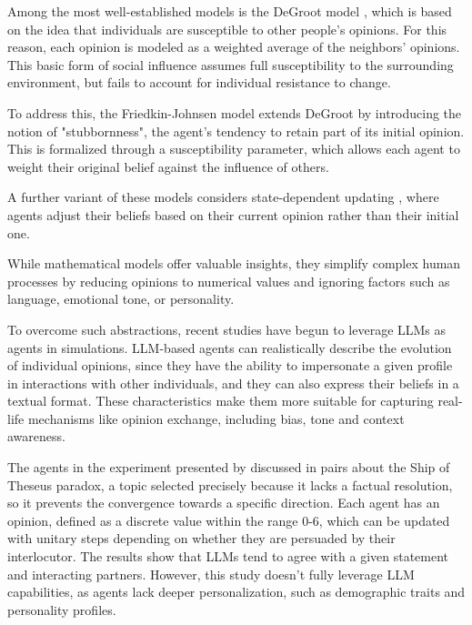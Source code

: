 \medskip
Among the most well-established models is the DeGroot model \cite{Degroot1974}, which is based on the idea that individuals are susceptible to other people's opinions. For this reason, each opinion is modeled as a weighted average of the neighbors' opinions.
This basic form of social influence assumes full susceptibility to the surrounding environment, but fails to account for individual resistance to change.

To address this, the Friedkin-Johnsen model \cite{friedkin_1990} extends DeGroot by introducing the notion of "stubbornness", the agent's tendency to retain part of its initial opinion. 
This is formalized through a susceptibility parameter, which allows each agent to weight their original belief against the influence of others.

A further variant of these models considers state-dependent updating \cite{Ye2018Opinion, Liu_2018}, where agents adjust their beliefs based on their current opinion rather than their initial one.


\medskip
While mathematical models offer valuable insights, they  simplify complex human processes by reducing opinions to numerical values and ignoring factors such as language, emotional tone, or personality.

To overcome such abstractions, recent studies have begun to leverage LLMs as agents in simulations. LLM-based agents can realistically describe the evolution of individual opinions, since they have the ability to impersonate a given profile in interactions with other individuals, and they can also express their beliefs in a textual format.
These characteristics make them more suitable for capturing real-life mechanisms like opinion exchange, including bias, tone and context awareness.

The agents in the experiment presented by \citet{cau2025languagedrivenopiniondynamicsagentbased} discussed in pairs about the Ship of Theseus paradox, a topic selected precisely because it lacks a factual resolution, so it prevents the convergence towards a specific direction.
Each agent has an opinion, defined as a discrete value within the range 0-6, which can be updated with unitary steps depending on whether they are persuaded by their interlocutor.
The results show that LLMs tend to agree with a given statement and interacting partners. However, this study doesn't fully leverage LLM capabilities, as agents lack deeper personalization, such as demographic traits and personality profiles.

